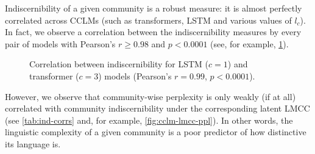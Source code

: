 \documentclass[11pt]{article}
\newcommand\Ppl{\mathsf{Ppl}}
\newcommand\IG{\mathsf{IG}}
\newcommand\Ind{\mathsf{Ind}}
\begin{document}
Indiscernibility of a given community is a robust measure: it is
almost perfectly correlated across CCLMs (such as transformers, LSTM
and various values of $l_c$).  In fact, we observe a correlation
between the indiscernibility measures by every pair of models with
Pearson's $r \geq 0.98$ and $p < 0.0001$ (see, for example,
\cref{fig:indisc-corr}).
%
\begin{figure}
  \caption{%
    Correlation between indiscernibility for 
    LSTM ($c = 1$) and transformer ($c = 3$) models
    (Pearson's $r = 0.99$, $p < 0.0001$).
  }
  \label{fig:indisc-corr}
\end{figure}
%
However, we observe that community-wise perplexity is only weakly (if at all) 
correlated with community indiscernibility under the corresponding latent 
LMCC (see \cref{tab:ind-corrs} and, for example, \cref{fig:cclm-lmcc-ppl}).
In other words, the linguistic complexity of a given community
is a poor predictor of how distinctive its language is.
%
\begin{table}
  \small
  \centering
  
  \caption{ Pearson's $r$ correlation coefficient between community
    indiscernibility ($\Ind_j$) and two different predictors: CCLM
    perplexity on messages from community $c_j$ ($\Ppl_{M_j}$), and
    CCLM information gain on messages from $c_j$ ($\IG_{M_j}$).  }
  \label{tab:ind-corrs}
\end{table}
%
\begin{figure*}
  \caption{%
    Average community indiscernibility (y-axis), 
    in relationship to linguistic complexity (left) and 
    CCLM information gain (right). Shown here for the LSTM
    model with $l_c=1$. See \cref{tab:ind-corrs} for 
    Pearson's r correlations for all models.
  }
  \label{fig:cclm-lmcc-ppl}
\end{figure*}
\end{document}
